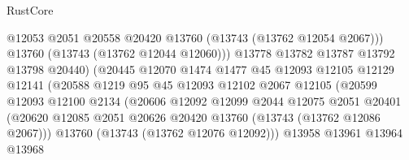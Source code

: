 \begin{lexlean}{RustCore}
\begin{coremodule}
                                        @12053
                                        @2051
                                        @20558
                                        @20420
                                        @13760
                                        (@13743 (@13762 @12054 @2067)))
                                      @13760
                                      (@13743 (@13762 @12044 @12060)))
                                    @13778
                                    @13782
                                    @13787
                                    @13792
                                    @13798
                                    @20440)
                                  (@20445
                                    @12070
                                    @1474
                                    @1477
                                    @45
                                    @12093
                                    @12105
                                    @12129
                                    @12141
                                    (@20588
                                      @1219
                                      @95
                                      @45
                                      @12093
                                      @12102
                                      @2067
                                      @12105
                                      (@20599
                                        @12093
                                        @12100
                                        @2134
                                        (@20606
                                          @12092
                                          @12099
                                          @2044
                                          @12075
                                          @2051
                                          @20401
                                          (@20620
                                            @12085
                                            @2051
                                            @20626
                                            @20420
                                            @13760
                                            (@13743 (@13762 @12086 @2067)))
                                          @13760
                                          (@13743 (@13762 @12076 @12092)))
                                        @13958
                                        @13961
                                        @13964
                                        @13968

\end{coremodule}
\end{lexlean}
